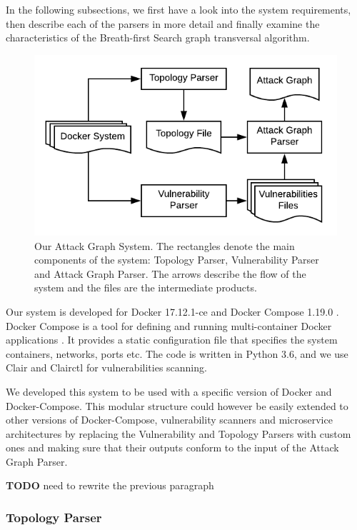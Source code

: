 In the following subsections, we first have a look into the system requirements, then describe each of the parsers in more detail and finally examine the characteristics of the Breath-first Search graph transversal algorithm.

\begin{figure}
	\includegraphics[scale=0.9]{./images/AttackGraphSystem}
	\caption{Our Attack Graph System. The rectangles denote the main components of the system: Topology Parser, Vulnerability Parser and Attack Graph Parser. The arrows describe the flow of the system and the files are the intermediate products.}
	\label{AttackGraphSystem}
\end{figure}

Our system is developed for Docker 17.12.1-ce and Docker Compose 1.19.0 \cite{merkel2014docker}. Docker Compose is a tool for defining and running multi-container Docker applications \cite{dockercompose}. It provides a static configuration file that specifies the system containers, networks, ports etc. The code is written in Python 3.6, and we use Clair \cite{clair} and Clairctl \cite{clairctl} for vulnerabilities scanning.

We developed this system to be used with a specific version of Docker and Docker-Compose. This modular structure could however be easily extended to other versions of Docker-Compose, vulnerability scanners and microservice architectures by replacing the Vulnerability and Topology Parsers with custom ones and making sure that their outputs conform to the input of the Attack Graph Parser.

\textbf{TODO} need to rewrite the previous paragraph \\
\subsubsection{Topology Parser}
\label{chap:topology_p}

